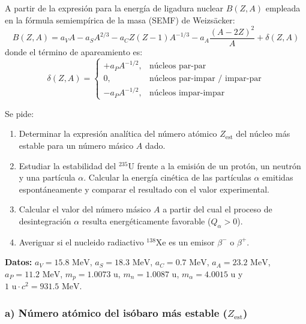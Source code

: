 \begin{problema}
A partir de la expresión para la energía de ligadura nuclear $B(Z,A)$ empleada en la fórmula semiempírica de la masa (SEMF) de Weizsäcker:
\begin{equation}
B(Z,A) = a_V A - a_S A^{2/3} - a_C Z(Z-1) A^{-1/3} - a_A \frac{(A-2Z)^2}{A} + \delta(Z,A)
\end{equation}
donde el término de apareamiento es:
\begin{equation}
\delta(Z,A) = 
\begin{cases} 
+a_P A^{-1/2}, & \text{núcleos par-par} \\ 
0, & \text{núcleos par-impar / impar-par} \\ 
-a_P A^{-1/2}, & \text{núcleos impar-impar} 
\end{cases}
\end{equation}

Se pide:
\begin{enumerate}[label=\alph*)]
    \item Determinar la expresión analítica del número atómico $Z_{\text{est}}$ del núcleo más estable para un número másico $A$ dado.
    \item Estudiar la estabilidad del ${}^{235}\text{U}$ frente a la emisión de un protón, un neutrón y una partícula $\alpha$. Calcular la energía cinética de las partículas $\alpha$ emitidas espontáneamente y comparar el resultado con el valor experimental.
    \item Calcular el valor del número másico $A$ a partir del cual el proceso de desintegración $\alpha$ resulta energéticamente favorable ($Q_\alpha > 0$).
    \item Averiguar si el nucleido radiactivo ${}^{138}\text{Xe}$ es un emisor $\beta^-$ o $\beta^+$.
\end{enumerate}

\textbf{Datos:} $a_V = 15.8\text{ MeV}$, $a_S = 18.3\text{ MeV}$, $a_C = 0.7\text{ MeV}$, $a_A = 23.2\text{ MeV}$, $a_P = 11.2\text{ MeV}$, $m_p = 1.0073\text{ u}$, $m_n = 1.0087\text{ u}$, $m_\alpha = 4.0015\text{ u}$ y $1\text{ u} \cdot c^2 = 931.5\text{ MeV}$.

\tcblower

\subsubsection*{a) Número atómico del isóbaro más estable ($Z_{\text{est}}$)}


\end{problema}

